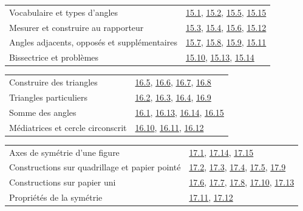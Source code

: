 \begin{tabularx}{\linewidth}{@{}Yl@{}}\toprule
Vocabulaire et types d’angles & \hyperref[exo-15-1]{15.1}, \hyperref[exo-15-2]{15.2}, \hyperref[exo-15-5]{15.5}, \hyperref[exo-15-15]{15.15}\\[2mm]
Mesurer et construire au rapporteur & \hyperref[exo-15-3]{15.3}, \hyperref[exo-15-4]{15.4}, \hyperref[exo-15-6]{15.6}, \hyperref[exo-15-12]{15.12}\\[2mm]
Angles adjacents, opposés et supplémentaires & \hyperref[exo-15-7]{15.7}, \hyperref[exo-15-8]{15.8}, \hyperref[exo-15-9]{15.9}, \hyperref[exo-15-11]{15.11}\\[2mm]
Bissectrice et problèmes & \hyperref[exo-15-10]{15.10}, \hyperref[exo-15-13]{15.13}, \hyperref[exo-15-14]{15.14}\\[2mm]
\bottomrule\end{tabularx}\par\vspace{4mm}
\clearpage
{}\fontsize{10}{13}\selectfont
{}\begin{tabularx}{\linewidth}{@{}Yl@{}}\toprule
Construire des triangles & \hyperref[exo-16-5]{16.5}, \hyperref[exo-16-6]{16.6}, \hyperref[exo-16-7]{16.7}, \hyperref[exo-16-8]{16.8}\\[2mm]
Triangles particuliers & \hyperref[exo-16-2]{16.2}, \hyperref[exo-16-3]{16.3}, \hyperref[exo-16-4]{16.4}, \hyperref[exo-16-9]{16.9}\\[2mm]
Somme des angles & \hyperref[exo-16-1]{16.1}, \hyperref[exo-16-13]{16.13}, \hyperref[exo-16-14]{16.14}, \hyperref[exo-16-15]{16.15}\\[2mm]
Médiatrices et cercle circonscrit & \hyperref[exo-16-10]{16.10}, \hyperref[exo-16-11]{16.11}, \hyperref[exo-16-12]{16.12}\\[2mm]
\bottomrule\end{tabularx}\par\vspace{4mm}
\begin{tabularx}{\linewidth}{@{}Yl@{}}\toprule
Axes de symétrie d’une figure & \hyperref[exo-17-1]{17.1}, \hyperref[exo-17-14]{17.14}, \hyperref[exo-17-15]{17.15}\\[2mm]
Constructions sur quadrillage et papier pointé & \hyperref[exo-17-2]{17.2}, \hyperref[exo-17-3]{17.3}, \hyperref[exo-17-4]{17.4}, \hyperref[exo-17-5]{17.5}, \hyperref[exo-17-9]{17.9}\\[2mm]
Constructions sur papier uni & \hyperref[exo-17-6]{17.6}, \hyperref[exo-17-7]{17.7}, \hyperref[exo-17-8]{17.8}, \hyperref[exo-17-10]{17.10}, \hyperref[exo-17-13]{17.13}\\[2mm]
Propriétés de la symétrie & \hyperref[exo-17-11]{17.11}, \hyperref[exo-17-12]{17.12}\\[2mm]
\bottomrule\end{tabularx}\par\vspace{4mm}
